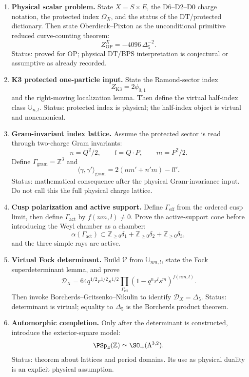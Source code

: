 \begin{enumerate}
\item \textbf{Physical scalar problem.}
State \(X=S\times E\), the D6--D2--D0 charge notation, the protected
index \(\Omega_X\), and the status of the DT/protected dictionary.  Then
state Oberdieck--Pixton as the unconditional primitive reduced
curve-counting theorem:
$$
Z^X_{\mathrm{OP}}=-4096\,\Delta_5^{-2}.
$$
Status: proved for OP; physical DT/BPS interpretation is conjectural or
assumptive as already recorded.

\item \textbf{K3 protected one-particle input.}
State the Ramond-sector index
$$
Z_{\mathrm{K3}}=2\phi_{0,1}
$$
and the right-moving localization lemma.  Then define the virtual
half-index class \(\mathbb U_{n,l}\).  Status: protected index is
physical; the half-index object is virtual and noncanonical.

\item \textbf{Gram-invariant index lattice.}
Assume the protected sector is read through two-charge Gram invariants:
$$
n=Q^2/2,\qquad l=Q\cdot P,\qquad m=P^2/2.
$$
Define \(\Gamma_{\mathrm{gram}}=\mathbb Z^3\) and
$$
\langle\gamma,\gamma'\rangle_{\mathrm{gram}}
=2(nm'+n'm)-ll'.
$$
Status: mathematical consequence after the physical Gram-invariance
input.  Do not call this the full physical charge lattice.

\item \textbf{Cusp polarization and active support.}
Define \(\Gamma_{\mathrm{eff}}\) from the ordered cusp limit, then define
\(\Gamma_{\mathrm{act}}\) by \(f(nm,l)\ne0\).  Prove the active-support
cone before introducing the Weyl chamber as a chamber:
$$
\alpha(\Gamma_{\mathrm{act}})
\subset
\mathbb Z_{\ge0}\delta_1+\mathbb Z_{\ge0}\delta_2+\mathbb Z_{\ge0}\delta_3,
$$
and the three simple rays are active.

\item \textbf{Virtual Fock determinant.}
Build \(\mathcal V\) from \(\mathbb U_{nm,l}\), state the Fock
superdeterminant lemma, and prove
$$
\mathcal D_X
=64q^{1/2}r^{1/2}s^{1/2}
\prod_{\Gamma_{\mathrm{eff}}}(1-q^nr^ls^m)^{f(nm,l)}.
$$
Then invoke Borcherds--Gritsenko--Nikulin to identify
\(\mathcal D_X=\Delta_5\).  Status: determinant is virtual; equality to
\(\Delta_5\) is the Borcherds product theorem.

\item \textbf{Automorphic completion.}
Only after the determinant is constructed, introduce the exterior-square
model:
$$
\PSp_4(\mathbb Z)\simeq \SO_+(\Lambda^{3,2}).
$$
Status: theorem about lattices and period domains.  Its use as physical
duality is an explicit physical assumption.


\end{enumerate}
